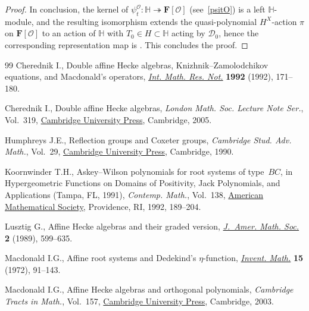 \documentclass[11pt]{article}
\numberwithin{equation}{section}
\numberwithin{equation}{section}
\begin{document}
\begin{proof}
In conclusion, the kernel of $\psi_t^\mathcal{O}\colon \mathbb{H}\twoheadrightarrow\mathbf{F}[\mathcal{O}]$ (see~\eqref{psitO})
is a left $\mathbb{H}$-module, and the resulting isomorphism 
extends the quasi-polynomial $H^X$-action $\pi$ on $\mathbf{F}[\mathcal{O}]$ to an action of $\mathbb{H}$ with $T_0\in H\subset\mathbb{H}$ acting by
$\mathcal{D}_0$, hence the corresponding representation map is . This concludes the proof.
\end{proof}
\begin{thebibliography}{99}
Cherednik I., Double affine {H}ecke algebras, {K}nizhnik--{Z}amolodchikov
 equations, and {M}acdonald's operators,
 \href{https://doi.org/10.1155/S1073792892000199}{\textit{Int. Math. Res.
 Not.}} \textbf{1992} (1992), 171--180.

Cherednik I., Double affine {H}ecke algebras, \textit{London Math. Soc. Lecture
 Note Ser.}, Vol.~319,
 \href{https://doi.org/10.1017/CBO9780511546501}{Cambridge University Press},
 Cambridge, 2005.

Humphreys J.E., Reflection groups and {C}oxeter groups, \textit{Cambridge Stud.
 Adv. Math.}, Vol.~29,
 \href{https://doi.org/10.1017/CBO9780511623646}{Cambridge University Press},
 Cambridge, 1990.

Koornwinder T.H., Askey--{W}ilson polynomials for root systems of type~{$BC$},
 in Hypergeometric Functions on Domains of Positivity, {J}ack Polynomials, and
 Applications ({T}ampa, {FL}, 1991), \textit{Contemp. Math.}, Vol.~138,
 \href{https://doi.org/10.1090/conm/138/1199128}{American Mathematical
 Society}, Providence, RI, 1992, 189--204.

Lusztig G., Affine {H}ecke algebras and their graded version,
 \href{https://doi.org/10.2307/1990945}{\textit{J.~Amer. Math. Soc.}}
 \textbf{2} (1989), 599--635.

Macdonald I.G., Affine root systems and {D}edekind's {$\eta $}-function,
 \href{https://doi.org/10.1007/BF01418931}{\textit{Invent. Math.}} \textbf{15}
 (1972), 91--143.

Macdonald I.G., Affine {H}ecke algebras and orthogonal polynomials,
 \textit{Cambridge Tracts in Math.}, Vol.~157,
 \href{https://doi.org/10.1017/CBO9780511542824}{Cambridge University Press},
 Cambridge, 2003.


\end{thebibliography}
\end{document}
